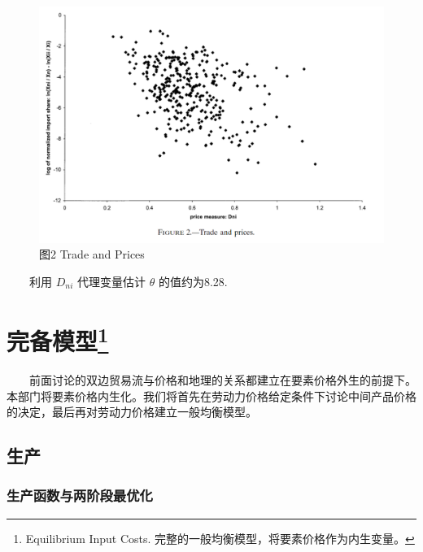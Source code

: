 \documentclass[]{tufte-handout}
\begin{document}
\begin{figure}

{\centering \includegraphics[width=1\linewidth]{Figures/Figure2} 

}

\caption[图2 Trade and Prices]{图2 Trade and Prices}\label{fig:p2}
\end{figure}

　　利用 \(D_{ni}\) 代理变量估计 \(\theta\) 的值约为8.28.

\hypertarget{ux5b8cux5907ux6a21ux578b}{%
\section[完备模型]{\texorpdfstring{完备模型\footnote{Equilibrium Input
  Costs. 完整的一般均衡模型，将要素价格作为内生变量。}}{完备模型}}\label{ux5b8cux5907ux6a21ux578b}}

　　前面讨论的双边贸易流与价格和地理的关系都建立在要素价格外生的前提下。本部门将要素价格内生化。我们将首先在劳动力价格给定条件下讨论中间产品价格的决定，最后再对劳动力价格建立一般均衡模型。

\hypertarget{ux751fux4ea7}{%
\subsection{生产}\label{ux751fux4ea7}}

\hypertarget{ux751fux4ea7ux51fdux6570ux4e0eux4e24ux9636ux6bb5ux6700ux4f18ux5316}{%
\subsubsection{生产函数与两阶段最优化}\label{ux751fux4ea7ux51fdux6570ux4e0eux4e24ux9636ux6bb5ux6700ux4f18ux5316}}
\end{document}
